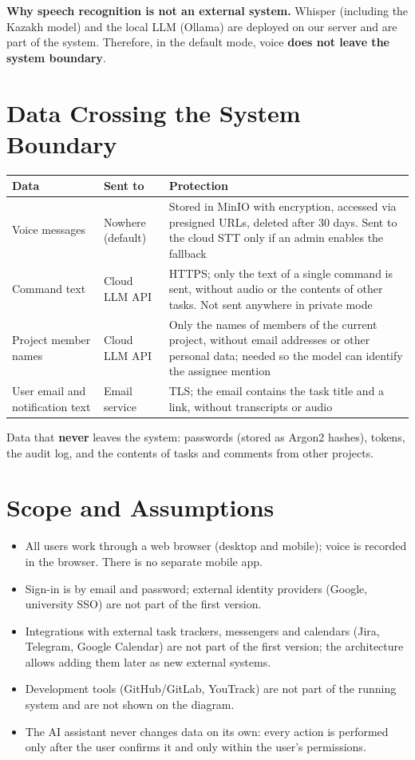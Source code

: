 \documentclass[11pt,a4paper]{article}
\newcommand{\tblstart}{\small\rowcolors{2}{gray!7}{white}}
\begin{document}
\textbf{Why speech recognition is not an external system.} Whisper (including the Kazakh model) and the local LLM (Ollama) are deployed on our server and are part of the system. Therefore, in the default mode, voice \textbf{does not leave the system boundary}.

\section{Data Crossing the System Boundary}

{\tblstart
\begin{xltabular}{\textwidth}{P{3.4cm} P{2.6cm} L}
\toprule
\textbf{Data} & \textbf{Sent to} & \textbf{Protection} \\
\midrule
\endhead
Voice messages & Nowhere (default) & Stored in MinIO with encryption, accessed via presigned URLs, deleted after 30 days. Sent to the cloud STT only if an admin enables the fallback \\
Command text & Cloud LLM API & HTTPS; only the text of a single command is sent, without audio or the contents of other tasks. Not sent anywhere in private mode \\
Project member names & Cloud LLM API & Only the names of members of the current project, without email addresses or other personal data; needed so the model can identify the assignee mention \\
User email and notification text & Email service & TLS; the email contains the task title and a link, without transcripts or audio \\
\bottomrule
\end{xltabular}}

Data that \textbf{never} leaves the system: passwords (stored as Argon2 hashes), tokens, the audit log, and the contents of tasks and comments from other projects.

\section{Scope and Assumptions}

\begin{itemize}
  \item All users work through a web browser (desktop and mobile); voice is recorded in the browser. There is no separate mobile app.
  \item Sign-in is by email and password; external identity providers (Google, university SSO) are not part of the first version.
  \item Integrations with external task trackers, messengers and calendars (Jira, Telegram, Google Calendar) are not part of the first version; the architecture allows adding them later as new external systems.
  \item Development tools (GitHub/GitLab, YouTrack) are not part of the running system and are not shown on the diagram.
  \item The AI assistant never changes data on its own: every action is performed only after the user confirms it and only within the user's permissions.
\end{itemize}
\end{document}
